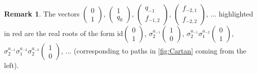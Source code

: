 \documentclass[11pt,a4paper]{amsart}
\theoremstyle{definition}
\newtheorem{Remark}[Lemma]{Remark}
\numberwithin{equation}{section}
\begin{document}
\begin{Remark}
The vectors $\begin{pmatrix} 0\\1 \end{pmatrix}$,
$\begin{pmatrix} 1\\q_0 \end{pmatrix}$,
$\begin{pmatrix} q_{-1}\\f_{-1,2} \end{pmatrix}$,
$\begin{pmatrix} f_{-2,1}\\f_{-2,2}\end{pmatrix}$,
$\ldots$ highlighted in red are the real roots of the 
form $\mathrm{id}\begin{pmatrix} 0\\1
\end{pmatrix}$, $\sigma_2^{a_{-1}}\begin{pmatrix} 1\\0
\end{pmatrix}$, $\sigma_2^{a_{-1}}\sigma_1^{a_{-2}} \begin{pmatrix} 0\\1\end{pmatrix}$,
$\sigma_2^{a_{-1}}\sigma_1^{a_{-2}}\sigma_2^{a_{-3}} \begin{pmatrix} 1\\0\end{pmatrix}$, $\ldots$
(corresponding to paths in \ref{fig:Cartan}
coming from the left). 


\end{Remark}
\end{document}
